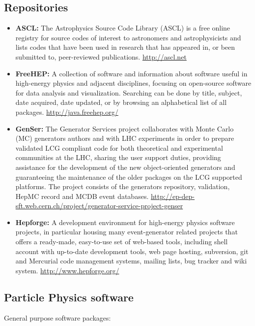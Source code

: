 \subsection{Repositories}\label{repositories}

\begin{itemize}
\item
  \textbf{ASCL:} The Astrophysics Source Code Library (ASCL) is a free
  online registry for source codes of interest to astronomers and
  astrophysicists and lists codes that have been used in research that
  has appeared in, or been submitted to, peer-reviewed publications.
  \url{http://ascl.net}
\item
  \textbf{FreeHEP:} A collection of software and information about
  software useful in high-energy physics and adjacent disciplines,
  focusing on open-source software for data analysis and visualization.
  Searching can be done by title, subject, date acquired, date updated,
  or by browsing an alphabetical list of all packages.
  \url{http://java.freehep.org/}
\item
  \textbf{GenSer:} The Generator Services project collaborates with
  Monte Carlo (MC) generators authors and with LHC experiments in order
  to prepare validated LCG compliant code for both theoretical and
  experimental communities at the LHC, sharing the user support duties,
  providing assistance for the development of the new object-oriented
  generators and guaranteeing the maintenance of the older packages on
  the LCG supported platforms. The project consists of the generators
  repository, validation, HepMC record and MCDB event databases.
  \url{http://ep-dep-sft.web.cern.ch/project/generator-service-project-genser}
\item
  \textbf{Hepforge:} A development environment for high-energy physics
  software projects, in particular housing many event-generator related
  projects that offers a ready-made, easy-to-use set of web-based tools,
  including shell account with up-to-date development tools, web page
  hosting, subversion, git and Mercurial code management systems,
  mailing lists, bug tracker and wiki system.
  \url{http://www.hepforge.org/}
\end{itemize}

\subsection{Particle Physics software}\label{particle-physics-software}

General purpose software packages:

